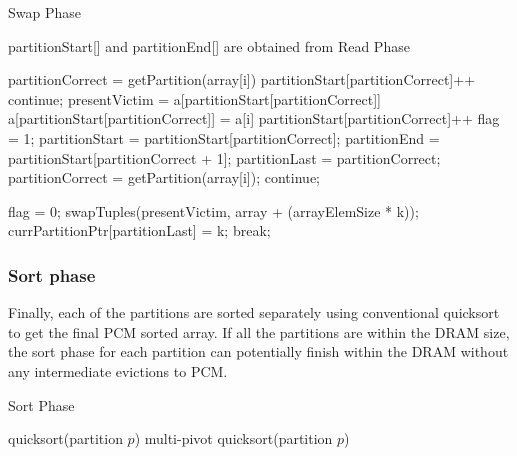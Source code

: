 \begin{algorithm}[h!]
\caption{Swap Phase}
\label{alg:swap_phase}
partitionStart[] and partitionEnd[] are obtained from Read Phase
\begin{algorithmic}[1]
	\State partitionCorrect = getPartition(array[i])
     \State partitionStart[partitionCorrect]++
	\State continue;
     \Else
			\State presentVictim = a[partitionStart[partitionCorrect]]             
            \State a[partitionStart[partitionCorrect]] = a[i]
            \State partitionStart[partitionCorrect]++
            \State flag = 1;
                \State partitionStart = partitionStart[partitionCorrect];
                \State partitionEnd = partitionStart[partitionCorrect + 1];
                \State partitionLast = partitionCorrect;
                \State partitionCorrect = getPartition(array[i]);
                        \State continue;
                        
                        \State flag = 0;
                    \EndIf
                    \State swapTuples(presentVictim, array + (arrayElemSize * k));
                    \State currPartitionPtr[partitionLast] = k;
                    \State break;
             
				\EndFor
			\EndWhile
	\EndIf
\EndFor
{}
\end{algorithmic}
\end{algorithm}


\subsubsection{Sort phase}
Finally, each of the partitions are sorted separately using conventional quicksort to get the final PCM sorted array. If all the partitions are within the DRAM size, the sort phase for each partition can potentially finish within the DRAM without any intermediate evictions to PCM. 

\begin{algorithm}
\caption{Sort Phase}
\label{alg:sort_phase}
\begin{algorithmic}[1]
\State quicksort(partition $p$)
\Else 
\State multi-pivot quicksort(partition $p$)
\EndIf 
\EndFor
\end{algorithmic}
\end{algorithm}

